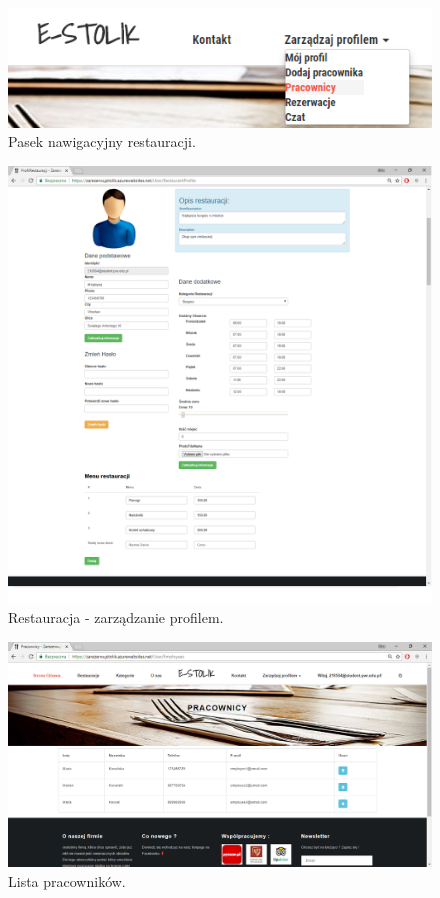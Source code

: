 \documentclass{article}
\begin{document}
\begin{figure}[H]
\centering
	\includegraphics[width=1.00\textwidth]{screens/menuRestaurant.png}
	\caption[caption]{Pasek nawigacyjny restauracji.}
\end{figure}


\begin{figure}[H]
\centering
	\includegraphics[width=1.00\textwidth]{screens/restaurantEdit.png}
	\caption[caption]{Restauracja - zarządzanie profilem.}
\end{figure}

\begin{figure}[H]
\centering
	\includegraphics[width=1.00\textwidth]{screens/employees.png}
	\caption[caption]{Lista pracowników.}
\end{figure}
\end{document}
